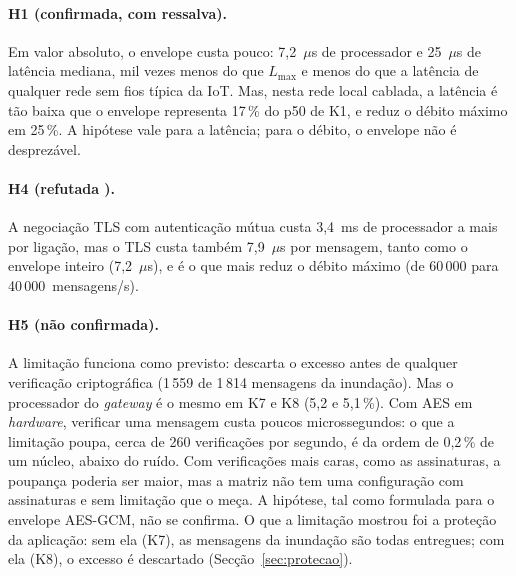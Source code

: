 \paragraph{H1 (confirmada, com ressalva).} Em valor absoluto, o envelope custa
pouco: 7,2~$\mu$s de processador e 25~$\mu$s de latência mediana, mil vezes menos
do que $L_{\max}$ e menos do que a latência de qualquer rede sem fios típica da
IoT. Mas, nesta rede local cablada, a latência é tão baixa que o envelope
representa 17\,\% do p50 de K1, e reduz o débito máximo em 25\,\%. A hipótese
vale para a latência; para o débito, o envelope não é desprezável.

\paragraph{H4 (refutada \texorpdfstring{\protect{}}{para ligações duradouras}).} A negociação TLS com
autenticação mútua custa 3,4~ms de processador a mais por ligação, mas o TLS custa
também 7,9~$\mu$s por mensagem, tanto como o envelope inteiro (7,2~$\mu$s), e é o
que mais reduz o débito máximo (de 60\,000 para 40\,000~mensagens/s). 

\paragraph{H5 (não confirmada).} A limitação funciona como previsto: descarta o
excesso antes de qualquer verificação criptográfica (1\,559 de 1\,814 mensagens
da inundação). Mas o processador do \emph{gateway} é o mesmo em K7 e K8 (5,2 e
5,1\,\%). Com AES em \emph{hardware}, verificar uma mensagem custa poucos
microssegundos: o que a limitação poupa, cerca de 260 verificações por segundo,
é da ordem de 0,2\,\% de um núcleo, abaixo do ruído. Com verificações mais caras,
como as assinaturas, a poupança poderia ser maior, mas a matriz não tem uma
configuração com assinaturas e sem limitação que o meça. A hipótese, tal como formulada para o
envelope AES-GCM, não se confirma. O que a limitação mostrou foi a proteção da
aplicação: sem ela (K7), as mensagens da inundação são todas entregues; com ela
(K8), o excesso é descartado (Secção~\ref{sec:protecao}).
